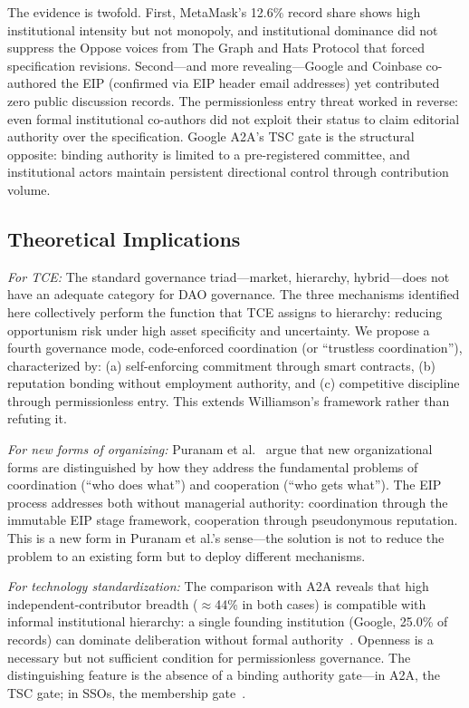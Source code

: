 \documentclass[conference]{IEEEtran}
\begin{document}
The evidence is twofold. First, MetaMask's 12.6\% record share shows high
institutional intensity but not monopoly, and institutional dominance did not
suppress the Oppose voices from The Graph and Hats Protocol that forced
specification revisions. Second---and more revealing---Google and Coinbase
co-authored the EIP (confirmed via EIP header email addresses) yet contributed
zero public discussion records. The permissionless entry threat worked in
reverse: even formal institutional co-authors did not exploit their status
to claim editorial authority over the specification. Google A2A's TSC gate
is the structural opposite: binding authority is limited to a pre-registered
committee, and institutional actors maintain persistent directional control
through contribution volume.

\subsection{Theoretical Implications}

\noindent\textit{For TCE:} The standard governance triad---market, hierarchy,
hybrid---does not have an adequate category for DAO governance. The three
mechanisms identified here collectively perform the function that TCE
assigns to hierarchy: reducing opportunism risk under high asset specificity
and uncertainty. We propose a fourth governance mode, code-enforced
coordination (or ``trustless coordination''), characterized by: (a) self-enforcing
commitment through smart contracts, (b) reputation bonding without employment
authority, and (c) competitive discipline through permissionless entry.
This extends Williamson's framework rather than refuting it.

\noindent\textit{For new forms of organizing:} Puranam et al.~\cite{puranam2014}
argue that new organizational forms are distinguished by how they address
the fundamental problems of coordination (``who does what'') and cooperation
(``who gets what''). The EIP process addresses both without managerial
authority: coordination through the immutable EIP stage framework,
cooperation through pseudonymous reputation. This is a new form in
Puranam et al.'s sense---the solution is not to reduce the problem to
an existing form but to deploy different mechanisms.

\noindent\textit{For technology standardization:} The comparison with
A2A reveals that high independent-contributor breadth ($\approx$44\% in both cases)
is compatible with informal institutional hierarchy: a single founding institution
(Google, 25.0\% of records) can dominate deliberation without formal authority~\cite{simcoe2012}. Openness is
a necessary but not sufficient condition for permissionless governance.
The distinguishing feature is the absence of a binding authority gate---in
A2A, the TSC gate; in SSOs, the membership gate~\cite{krechmer2006}.
\end{document}
